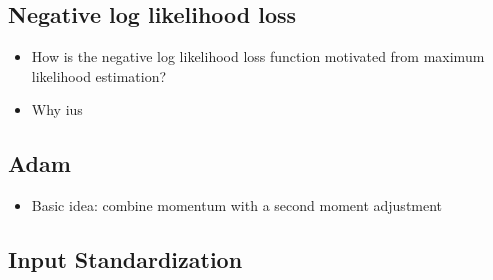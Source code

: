 \documentclass{article}
\begin{document}
\subsection{Negative log likelihood loss}
\begin{itemize}
    \item How is the negative log likelihood loss function motivated from maximum likelihood estimation?
    \item Why ius 
\end{itemize}

\subsection{Adam}
\begin{itemize}
    \item Basic idea: combine momentum with a second moment adjustment
\end{itemize}


\subsection{Input Standardization}


\end{document}
